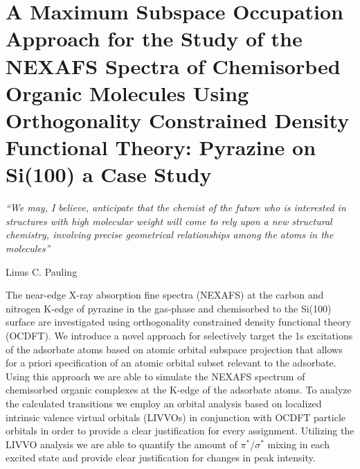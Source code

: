 \documentclass{article}
\begin{document}
\chapter{A Maximum Subspace Occupation Approach for the Study of the NEXAFS Spectra of Chemisorbed Organic Molecules Using Orthogonality Constrained Density Functional Theory: Pyrazine on Si(100) a Case Study}
\epigraph{\textit{``We may, I believe, anticipate that the chemist of the future who is interested in structures with high molecular weight will come to rely upon a new structural chemistry, involving precise geometrical relationships among the atoms in the molecules''}}{Linus C. Pauling}
\begin{chapabstract}
The near-edge X-ray absorption fine spectra (NEXAFS) at the carbon and nitrogen K-edge of pyrazine in the gas-phase and chemisorbed to the Si(100) surface are investigated using orthogonality constrained density functional theory (OCDFT). We introduce a novel approach for selectively target the 1s excitations of the adsorbate atoms based on atomic orbital subspace projection that allows for a priori specification of an atomic orbital subset relevant to the adsorbate. Using this approach we are able to simulate the NEXAFS spectrum of chemisorbed organic complexes at the K-edge of the adsorbate atoms. To analyze the calculated transitions we employ an orbital analysis based on localized intrinsic valence virtual orbitals (LIVVOs) in conjunction with OCDFT particle orbitals in order to provide a clear justification for every assignment.   Utilizing the LIVVO analysis we are able to quantify the amount of $\pi^*$/$\sigma^*$ mixing in each excited state and provide clear justification for changes in peak intensity.
\end{chapabstract}
\end{document}
